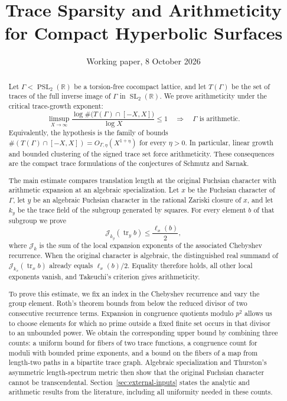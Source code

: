 \documentclass[11pt,reqno]{amsart}
\title[Trace sparsity and arithmeticity]
 {Trace Sparsity and Arithmeticity for Compact Hyperbolic Surfaces}
\author{}
\date{Working paper, 8 October 2026}
\theoremstyle{definition}
\theoremstyle{remark}
\newcommand{\R}{\mathbb R}
\newcommand{\cJ}{\mathcal J}
\newcommand{\Tr}{\operatorname{tr}}
\newcommand{\SL}{\operatorname{SL}}
\newcommand{\PSL}{\operatorname{PSL}}
\begin{document}
\begin{abstract}
Let \(\Gamma<\PSL_2(\R)\) be a torsion-free cocompact lattice, and let
\(T(\Gamma)\) be the set of traces of the full inverse image of \(\Gamma\)
in \(\SL_2(\R)\).  We prove arithmeticity under the critical
trace-growth exponent:
\[
 \limsup_{X\to\infty}
 \frac{\log\#\bigl(T(\Gamma)\cap[-X,X]\bigr)}{\log X}\le1
 \quad\Longrightarrow\quad
 \Gamma\text{ is arithmetic}.
\]
Equivalently, the hypothesis is the family of bounds
\(\#(T(\Gamma)\cap[-X,X])=O_{\Gamma,\eta}(X^{1+\eta})\) for every
\(\eta>0\).  In particular, linear growth and bounded clustering of the
signed trace set force arithmeticity.  These consequences are the compact
trace formulations of the conjectures of Schmutz and Sarnak.

The main estimate compares translation length at the original Fuchsian
character with arithmetic expansion at an algebraic specialization.
Let \(x\) be the Fuchsian character of \(\Gamma\), let \(y\) be an algebraic
Fuchsian character in the rational Zariski closure of \(x\), and let \(k_y\)
be the trace field of the subgroup generated by squares.  For every element
\(b\) of that subgroup we prove
\[
 \cJ_{k_y}(\Tr_y b)\le \frac{\ell_x(b)}2,
\]
where \(\cJ_k\) is the sum of the local expansion exponents of the associated
Chebyshev recurrence.  When the original character is algebraic, the
distinguished real summand of \(\cJ_{k_x}(\Tr_x b)\) already equals
\(\ell_x(b)/2\).  Equality therefore holds, all other local exponents
vanish, and Takeuchi's criterion gives arithmeticity.

To prove this estimate, we fix an index in the Chebyshev recurrence and
vary the group element.  Roth's theorem bounds from below the reduced
divisor of two consecutive recurrence terms.  Expansion in congruence
quotients modulo \(p^2\) allows us to choose elements for which no prime
outside a fixed finite set occurs in that divisor to an unbounded power.
We obtain the corresponding
upper bound by combining three counts: a uniform bound for fibers of two
trace functions, a congruence count for moduli with bounded prime
exponents, and a bound on the fibers of a map from length-two paths in a
bipartite trace graph.  Algebraic specialization and Thurston's asymmetric
length-spectrum metric then show that the original Fuchsian character
cannot be transcendental.  Section~\ref{sec:external-inputs} states the
analytic and arithmetic results from the literature, including all
uniformity needed in these counts.
\end{abstract}
\end{document}
